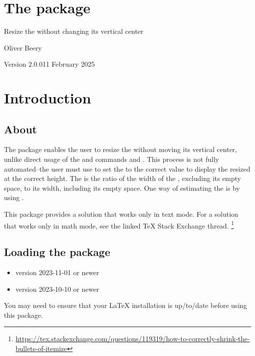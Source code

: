 \documentclass{beery}
\begin{document}
\section*
  {%
    The  package%
  }

Resize the  without changing its vertical center

Oliver Beery

Version 2.0.0\quad{}11 February 2025


\section{Introduction}
\label{sec:intro}

\subsection{About}

The  package enables the user to resize the  without moving its vertical center, unlike direct usage of the \LaTeXe{} and  commands  and .
This process is not fully automated\---the user must use  to set the \textbulletfactor{} to the correct value to display the resized  at the correct height.
The \textbulletfactor{} is the ratio of the width of the , excluding its empty space, to its width, including its empty space.
One way of estimating the \textbulletfactor{} is by using .

This package provides a solution that works only in text mode.
For a solution that works only in math mode, see the linked \TeX{} Stack Exchange thread.%
\footnote{\url{https://tex.stackexchange.com/questions/119319/how-to-correctly-shrink-the-bullets-of-itemize}}

\subsection{Loading the package}

\begin{itemize}
  \item \LaTeXe{} version 2023-11-01 or newer
  \item {} version 2023-10-10 or newer
\end{itemize}

You may need to ensure that your \LaTeX{} installation is up\-/to\-/date before using this package.
\end{document}
